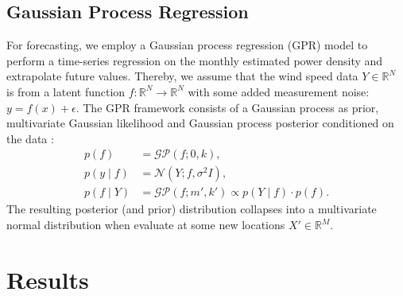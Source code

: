 \documentclass{article}
\theoremstyle{plain}
\theoremstyle{definition}
\theoremstyle{remark}
\begin{document}
\subsection{Gaussian Process Regression}\label{sec:gp}
For forecasting, we employ a Gaussian process regression (GPR) model to perform a time-series regression on the monthly estimated power density and extrapolate future values. Thereby, we assume that the wind speed data $Y \in \mathbb{R}^N$ is from a latent function $f: \mathbb{R}^N \rightarrow \mathbb{R}^N$ with some added measurement noise: $y = f(x) + \epsilon$. The GPR framework consists of a Gaussian process as prior, multivariate Gaussian likelihood and Gaussian process posterior conditioned on the data 
\cite{rasmussen-williams-gp}:
\begin{align}
    \label{eq:gp_prior}
    p(f) &= \mathcal{GP}(f; 0, k), \\
    \label{eq:gp_likelihood}
    p(y \mid f) &= \mathcal{N}(Y; f, \sigma^2 I), \\
    \label{eq:gp_posterior}
    p(f \mid Y) &= \mathcal{GP}(f; m', k') \propto p(Y \mid f) \cdot p(f).
\end{align}
The resulting posterior (and prior) distribution collapses into a multivariate normal distribution when evaluate at some new locations $X' \in \mathbb{R}^M$.

\section{Results}\label{sec:results}
\end{document}
